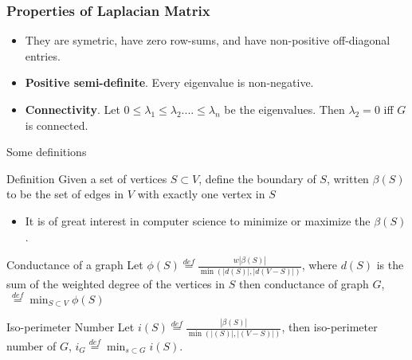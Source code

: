 \documentclass[10pt,sans,serif,trans]{beamer}
\begin{document}
\begin{frame}
  \frametitle{Properties of Laplacian Matrix}
\begin{itemize}
  \item They are symetric, have zero row-sums, and have non-positive
off-diagonal entries.
  \item \textbf{Positive semi-definite}. Every eigenvalue is non-negative.
  \item \textbf{Connectivity}. Let $0 \leq \lambda_1 \leq
\lambda_2 .... \leq \lambda_n$ be the eigenvalues. Then $\lambda_2 = 0$ iff $G$
is connected.
\end{itemize}
\end{frame}
\begin{frame}{Some definitions}
\begin{block}{Definition}
  Given a set of vertices $S \subset V$, define the boundary of $S$, written $\beta(S)$ to be
the set of edges in $V$ with exactly one vertex in $S$
\end{block}
\begin{itemize}
   \item It is of great interest in computer science to minimize or maximize the $\beta(S)$. 
\end{itemize}

\begin{block}{Conductance of a graph}
   Let $\phi(S) \stackrel{def}{=} \frac{w|\beta(S)|}{\min(|d(S)|, |d(V-S)|)}$, where $d(S)$ is the
sum of the weighted degree of the vertices in $S$ then conductance of graph $G$, $\
\stackrel{def}{=} {\min}_{S \subset V} \phi(S) $
\end{block}

\begin{block}{Iso-perimeter Number}
   Let $i(S) \stackrel{def}{=} \frac{|\beta(S)|}{\min(|(S)|, |(V-S)|)}$, then iso-perimeter
number of $G$,  $i_G \stackrel{def}{=} \min_{s \subset G} i(S)$.
\end{block}

\end{frame}
\end{document}
